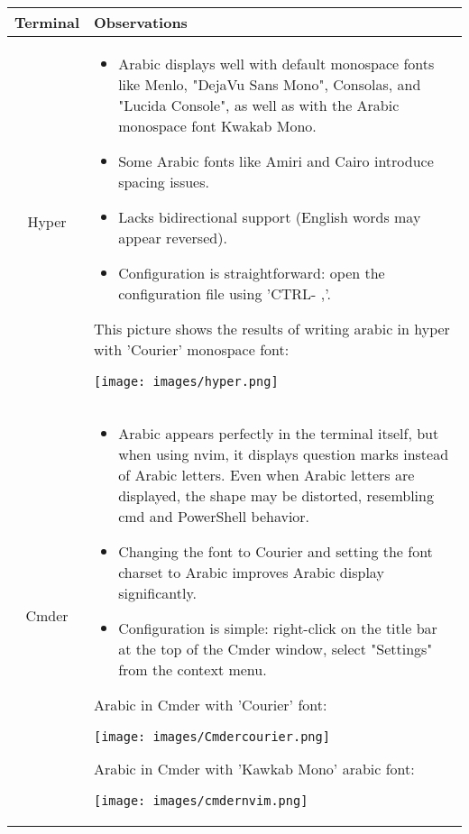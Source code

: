\documentclass[12pt, letterpaper]{article}
\begin{document}
\begin{longtable}{|c|p{10cm}|}
    
    \hline
    \textbf{Terminal} & \textbf{Observations} \\
    \hline
    \centering Hyper &
    \begin{itemize}[leftmargin=*]
        \item Arabic displays well with default monospace fonts like Menlo, "DejaVu Sans Mono", Consolas, and "Lucida Console", as well as with the Arabic monospace font Kwakab Mono.
        \item Some Arabic fonts like Amiri and Cairo introduce spacing issues.
        \item Lacks bidirectional support (English words may appear reversed).
        \item Configuration is straightforward: open the configuration file using 'CTRL- ,'.
    \end{itemize}
    This picture shows the results of writing arabic in hyper with 'Courier' monospace font:\newline
 

    \texttt{[image: images/hyper.png]}

\\
    \hline
    \centering Cmder &
    \begin{itemize}
        \item Arabic appears perfectly in the terminal itself, but when using nvim, it displays question marks instead of Arabic letters. Even when Arabic letters are displayed, the shape may be distorted, resembling cmd and PowerShell behavior.
        \item Changing the font to Courier and setting the font charset to Arabic improves Arabic display significantly.
        \item Configuration is simple: right-click on the title bar at the top of the Cmder window, select "Settings" from the context menu.
    \end{itemize}

    Arabic in Cmder with 'Courier' font:\newline

    \texttt{[image: images/Cmdercourier.png]}\newline

    Arabic in Cmder with 'Kawkab Mono' arabic font:\newline

    \texttt{[image: images/cmdernvim.png]}


\end{longtable}
\end{document}
